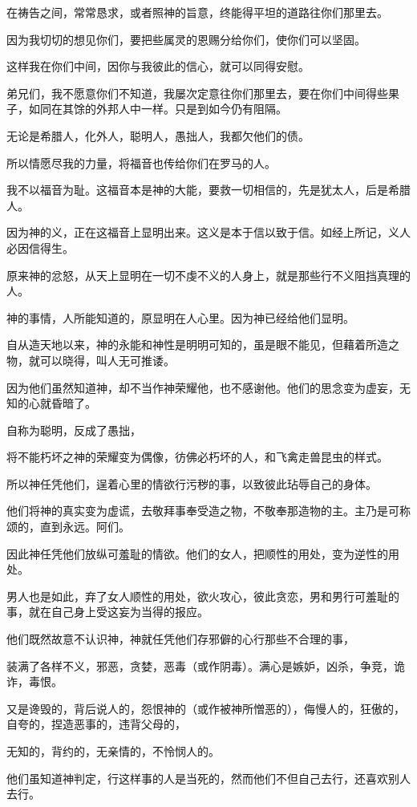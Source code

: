 \documentclass[12pt,oneside]{book}
\begin{document}
在祷告之间，常常恳求，或者照神的旨意，终能得平坦的道路往你们那里去。

因为我切切的想见你们，要把些属灵的恩赐分给你们，使你们可以坚固。

这样我在你们中间，因你与我彼此的信心，就可以同得安慰。

弟兄们，我不愿意你们不知道，我屡次定意往你们那里去，要在你们中间得些果子，如同在其馀的外邦人中一样。只是到如今仍有阻隔。

无论是希腊人，化外人，聪明人，愚拙人，我都欠他们的债。

所以情愿尽我的力量，将福音也传给你们在罗马的人。

我不以福音为耻。这福音本是神的大能，要救一切相信的，先是犹太人，后是希腊人。

因为神的义，正在这福音上显明出来。这义是本于信以致于信。如经上所记，义人必因信得生。

原来神的忿怒，从天上显明在一切不虔不义的人身上，就是那些行不义阻挡真理的人。

神的事情，人所能知道的，原显明在人心里。因为神已经给他们显明。

自从造天地以来，神的永能和神性是明明可知的，虽是眼不能见，但藉着所造之物，就可以晓得，叫人无可推诿。

因为他们虽然知道神，却不当作神荣耀他，也不感谢他。他们的思念变为虚妄，无知的心就昏暗了。

自称为聪明，反成了愚拙，

将不能朽坏之神的荣耀变为偶像，彷佛必朽坏的人，和飞禽走兽昆虫的样式。

所以神任凭他们，逞着心里的情欲行污秽的事，以致彼此玷辱自己的身体。

他们将神的真实变为虚谎，去敬拜事奉受造之物，不敬奉那造物的主。主乃是可称颂的，直到永远。阿们。

因此神任凭他们放纵可羞耻的情欲。他们的女人，把顺性的用处，变为逆性的用处。

男人也是如此，弃了女人顺性的用处，欲火攻心，彼此贪恋，男和男行可羞耻的事，就在自己身上受这妄为当得的报应。

他们既然故意不认识神，神就任凭他们存邪僻的心行那些不合理的事，

装满了各样不义，邪恶，贪婪，恶毒（或作阴毒）。满心是嫉妒，凶杀，争竞，诡诈，毒恨。

又是谗毁的，背后说人的，怨恨神的（或作被神所憎恶的），侮慢人的，狂傲的，自夸的，捏造恶事的，违背父母的，

无知的，背约的，无亲情的，不怜悯人的。

他们虽知道神判定，行这样事的人是当死的，然而他们不但自己去行，还喜欢别人去行。
\end{document}
